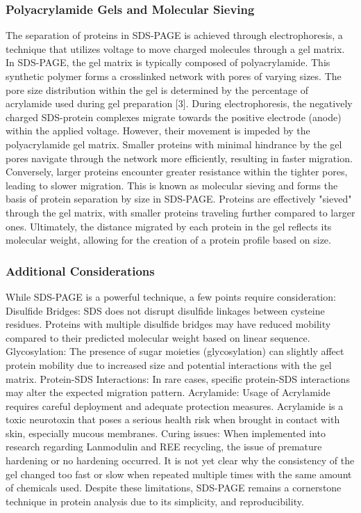 \subsubsection{Polyacrylamide Gels and Molecular Sieving}

The separation of proteins in SDS-PAGE is achieved through electrophoresis, a technique
that utilizes voltage to move charged molecules through a gel matrix. In SDS-PAGE, the
gel matrix is typically composed of polyacrylamide. This synthetic polymer forms a crosslinked network with pores of varying sizes. The pore size distribution within the gel is
determined by the percentage of acrylamide used during gel preparation [3].
During electrophoresis, the negatively charged SDS-protein complexes migrate towards
the positive electrode (anode) within the applied voltage. However, their movement is
impeded by the polyacrylamide gel matrix. Smaller proteins with minimal hindrance by
the gel pores navigate through the network more efficiently, resulting in faster migration.
Conversely, larger proteins encounter greater resistance within the tighter pores, leading
to slower migration.
This is known as molecular sieving and forms the basis of protein separation by size in
SDS-PAGE. Proteins are effectively "sieved" through the gel matrix, with smaller proteins
traveling further compared to larger ones. Ultimately, the distance migrated by each
protein in the gel reflects its molecular weight, allowing for the creation of a protein
profile based on size.

\subsubsection{Additional Considerations}
While SDS-PAGE is a powerful technique, a few points require consideration:
Disulfide Bridges: SDS does not disrupt disulfide linkages between cysteine residues.
Proteins with multiple disulfide bridges may have reduced mobility compared to their
predicted molecular weight based on linear sequence.
Glycosylation: The presence of sugar moieties (glycosylation) can slightly affect protein
mobility due to increased size and potential interactions with the gel matrix.
Protein-SDS Interactions: In rare cases, specific protein-SDS interactions may alter the
expected migration pattern.
Acrylamide: Usage of Acrylamide requires careful deployment and adequate protection
measures. Acrylamide is a toxic neurotoxin that poses a serious health risk when brought
in contact with skin, especially mucous membranes.
Curing issues: When implemented into research regarding Lanmodulin and REE recycling,
the issue of premature hardening or no hardening occurred. It is not yet clear why the
consistency of the gel changed too fast or slow when repeated multiple times with the
same amount of chemicals used.
Despite these limitations, SDS-PAGE remains a cornerstone technique in protein analysis
due to its simplicity, and reproducibility.
